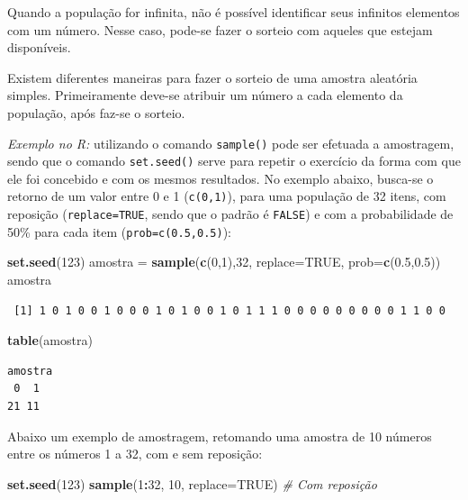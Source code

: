 \documentclass[12pt,brazil,oneside]{book}
\newenvironment{Shaded}{\begin{snugshade}}{\end{snugshade}}
\newcommand{\CommentTok}[1]{\textcolor[rgb]{0.56,0.35,0.01}{\textit{#1}}}
\newcommand{\DataTypeTok}[1]{\textcolor[rgb]{0.13,0.29,0.53}{#1}}
\newcommand{\DecValTok}[1]{\textcolor[rgb]{0.00,0.00,0.81}{#1}}
\newcommand{\FloatTok}[1]{\textcolor[rgb]{0.00,0.00,0.81}{#1}}
\newcommand{\KeywordTok}[1]{\textcolor[rgb]{0.13,0.29,0.53}{\textbf{#1}}}
\newcommand{\NormalTok}[1]{#1}
\newcommand{\OperatorTok}[1]{\textcolor[rgb]{0.81,0.36,0.00}{\textbf{#1}}}
\newcommand{\OtherTok}[1]{\textcolor[rgb]{0.56,0.35,0.01}{#1}}
\newcommand{\StringTok}[1]{\textcolor[rgb]{0.31,0.60,0.02}{#1}}
\begin{document}
Quando a população for infinita, não é possível identificar seus infinitos elementos com um número.
Nesse caso, pode-se fazer o sorteio com aqueles que estejam disponíveis.

Existem diferentes maneiras para fazer o sorteio de uma amostra aleatória simples. Primeiramente
deve-se atribuir um número a cada elemento da população, após faz-se o sorteio.

\emph{Exemplo no R:} utilizando o comando \texttt{sample()} pode ser efetuada a amostragem, sendo que o comando \texttt{set.seed()} serve para repetir o exercício da forma com que ele foi concebido e com os mesmos resultados. No exemplo abaixo, busca-se o retorno de um valor entre 0 e 1 (\texttt{c(0,1)}), para uma população de 32 itens, com reposição (\texttt{replace=TRUE}, sendo que o padrão é \texttt{FALSE}) e com a probabilidade de 50\% para cada item (\texttt{prob=c(0.5,0.5)}):

\begin{Shaded}
\begin{Highlighting}[]
\KeywordTok{set.seed}\NormalTok{(}\DecValTok{123}\NormalTok{)}
\NormalTok{amostra =}\StringTok{ }\KeywordTok{sample}\NormalTok{(}\KeywordTok{c}\NormalTok{(}\DecValTok{0}\NormalTok{,}\DecValTok{1}\NormalTok{),}\DecValTok{32}\NormalTok{, }\DataTypeTok{replace=}\OtherTok{TRUE}\NormalTok{, }\DataTypeTok{prob=}\KeywordTok{c}\NormalTok{(}\FloatTok{0.5}\NormalTok{,}\FloatTok{0.5}\NormalTok{))}
\NormalTok{amostra}
\end{Highlighting}
\end{Shaded}

\begin{verbatim}
 [1] 1 0 1 0 0 1 0 0 0 1 0 1 0 0 1 0 1 1 1 0 0 0 0 0 0 0 0 0 1 1 0 0
\end{verbatim}

\begin{Shaded}
\begin{Highlighting}[]
\KeywordTok{table}\NormalTok{(amostra)}
\end{Highlighting}
\end{Shaded}

\begin{verbatim}
amostra
 0  1 
21 11 
\end{verbatim}

Abaixo um exemplo de amostragem, retomando uma amostra de 10 números entre os números 1 a 32, com e sem reposição:

\begin{Shaded}
\begin{Highlighting}[]
\KeywordTok{set.seed}\NormalTok{(}\DecValTok{123}\NormalTok{)}
\KeywordTok{sample}\NormalTok{(}\DecValTok{1}\OperatorTok{:}\DecValTok{32}\NormalTok{, }\DecValTok{10}\NormalTok{, }\DataTypeTok{replace=}\OtherTok{TRUE}\NormalTok{) }\CommentTok{# Com reposição}
\end{Highlighting}
\end{Shaded}
\end{document}

